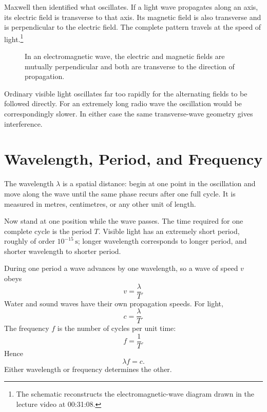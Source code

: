 Maxwell then identified what oscillates. If a light wave propagates along an axis, its electric field is transverse to that axis. Its magnetic field is also transverse and is perpendicular to the electric field. The complete pattern travels at the speed of light.\footnote{The schematic reconstructs the electromagnetic-wave diagram drawn in the lecture video at 00:31:08.}

\begin{figure}[h]
\centering
{}
\caption{In an electromagnetic wave, the electric and magnetic fields are mutually perpendicular and both are transverse to the direction of propagation.}
\end{figure}

Ordinary visible light oscillates far too rapidly for the alternating fields to be followed directly. For an extremely long radio wave the oscillation would be correspondingly slower. In either case the same transverse-wave geometry gives interference.

\section{Wavelength, Period, and Frequency}

The wavelength \(\lambda\) is a spatial distance: begin at one point in the oscillation and move along the wave until the same phase recurs after one full cycle. It is measured in metres, centimetres, or any other unit of length.

Now stand at one position while the wave passes. The time required for one complete cycle is the period \(T\). Visible light has an extremely short period, roughly of order \(10^{-15}\,\mathrm{s}\); longer wavelength corresponds to longer period, and shorter wavelength to shorter period.

During one period a wave advances by one wavelength, so a wave of speed \(v\) obeys
\begin{equation}
v=\frac{\lambda}{T}.
\end{equation}
Water and sound waves have their own propagation speeds. For light,
\begin{equation}
c=\frac{\lambda}{T}.
\end{equation}
The frequency \(f\) is the number of cycles per unit time:
\begin{equation}
f=\frac{1}{T}.
\end{equation}
Hence
\begin{equation}
\lambda f=c.
\end{equation}
Either wavelength or frequency determines the other.

